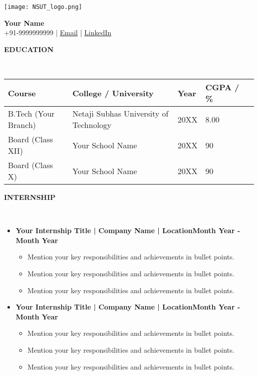 \documentclass[11pt,article]{article}
\newcommand{\resheading}[1]{{\small \colorbox{mygrey} { \begin{minipage}{0.99\textwidth}{\textbf{#1 \vphantom{p\^{E}}}}\end{minipage}}}}
\begin{document}
\begin{table}
    \begin{minipage}{0\linewidth}
        \centering
        \texttt{[image: NSUT\_logo.png]}
    \end{minipage}
    \begin{minipage}{1\linewidth}
        \centering
        \def\arraystretch{1}
        \textbf{\Large{Your Name}}\\ \vspace{0.4em}
        +91-9999999999 |
        \href{mailto:your.email@example.com}{Email} |
        \href{https://www.linkedin.com/in/}{LinkedIn}
    \end{minipage}\hfill
\end{table}
\setlength{\tabcolsep}{18pt}

\begin{table}
\centering
\resheading{\textbf{EDUCATION} }\\
\vspace{0.4em}
\begin{tabular}{lllll}
\textbf{Course}    & \textbf{College / University}     & \textbf{Year}     & \textbf{CGPA / \%} \\ 
\toprule
B.Tech (Your Branch)   & Netaji Subhas University of Technology  & 20XX   & 8.00 \\  
Board (Class XII)      & Your School Name & 20XX & 90  \\ 
Board (Class X)        & Your School Name & 20XX & 90
\end{tabular}
\end{table}

\noindent
\resheading{\textbf{INTERNSHIP} }\\[-0.35cm]
\vspace{-0.4em}
\begin{itemize}
\setlength\itemsep{-0.3em}
\item \textbf{Your Internship Title | Company Name | Location}\hfill \textbf{Month Year - Month Year} 
\vspace{-0.5em}
\begin{itemize}[noitemsep]
    \item Mention your key responsibilities and achievements in bullet points.
    \item Mention your key responsibilities and achievements in bullet points.
    \item Mention your key responsibilities and achievements in bullet points.
\end{itemize}
\item \textbf{Your Internship Title | Company Name | Location}\hfill \textbf{Month Year - Month Year} 
\vspace{-0.5em}
\begin{itemize}[noitemsep]
    \item Mention your key responsibilities and achievements in bullet points.
    \item Mention your key responsibilities and achievements in bullet points.
    \item Mention your key responsibilities and achievements in bullet points.
\end{itemize}
\end{itemize}
\end{document}
